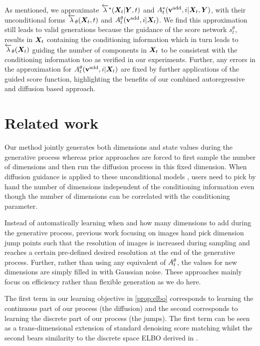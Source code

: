 As mentioned, we approximate $\overleftarrow{\lambda}^*({\bm{X}}_t | {\bm{Y}}, t)$ and $A_t^*({\mathbf{v}}^{\textup{add}}, i | {\bm{X}}_t, {\bm{Y}})$, with their unconditional forms $\overleftarrow{\lambda}_\theta({\bm{X}}_t, t)$ and $A_t^\theta({\mathbf{v}}^{\textup{add}}, i | {\bm{X}}_t)$. We find this approximation still leads to valid generations because the guidance of the score network $s_t^\theta$, results in ${\bm{X}}_t$ containing the conditioning information which in turn leads to $\overleftarrow{\lambda}_\theta({\bm{X}}_t)$ guiding the number of components in ${\bm{X}}_t$ to be consistent with the conditioning information too as verified in our experiments. Further, any errors in the approximation for $A_t^\theta({\mathbf{v}}^{\textup{add}}, i | {\bm{X}}_t)$ are fixed by further applications of the guided score function, highlighting the benefits of our combined autoregressive and diffusion based approach.



\section{Related work}

Our method jointly generates both dimensions and state values during the generative process whereas prior approaches \cite{hoogeboom2022equivariant, igashov2022equivariant} are forced to first sample the number of dimensions and then run the diffusion process in this fixed dimension. When diffusion guidance is applied to these unconditional models \cite{weiss2023guided, zhang2023towards}, users need to pick by hand the number of dimensions independent of the conditioning information even though the number of dimensions can be correlated with the conditioning parameter.

Instead of automatically learning when and how many dimensions to add during the generative process, previous work focusing on images \cite{jing2022subspace, zhang2022dimensionality} hand pick dimension jump points such that the resolution of images is increased during sampling and reaches a certain pre-defined desired resolution at the end of the generative process. Further, rather than using any equivalent of $A_t^\theta$, the values for new dimensions are simply filled in with Gaussian noise. These approaches mainly focus on efficiency rather than flexible generation as we do here.


The first term in our learning objective in \cref{prop:elbo} corresponds to learning the continuous part of our process (the diffusion) and the second corresponds to learning the discrete part of our process (the jumps). The first term can be seen as a trans-dimensional extension of standard denoising score matching \cite{vincent2011connection} whilst the second bears similarity to the discrete space ELBO derived in \cite{campbell2022continuous}.

